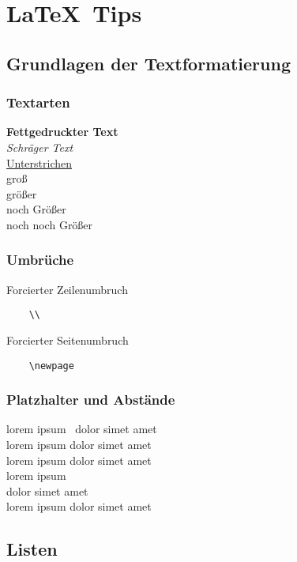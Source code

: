 \chapter{\LaTeX \, Tips}
\section{Grundlagen der Textformatierung}
\subsection{Textarten}

\textbf{Fettgedruckter Text}\\
\emph{Schräger Text}\\
\vspace{1cm}
\underline{Unterstrichen}\\
{\large groß} \\
{\Large größer} \\
{\huge noch Größer} \\
{\Huge noch noch Größer} \\



\subsection{Umbrüche}
Forcierter Zeilenumbruch
\begin{verbatim}
    \\
\end{verbatim}
Forcierter Seitenumbruch
\begin{verbatim}
    \newpage
\end{verbatim}

\subsection{Platzhalter und Abstände}
lorem ipsum \, dolor simet amet\\
lorem ipsum \quad dolor simet amet\\
lorem ipsum \hspace{1cm} dolor simet amet\\
lorem ipsum \vspace{1cm}\\
dolor simet amet\\
lorem ipsum \hfill dolor simet amet\\

\newpage

\section{Listen}
